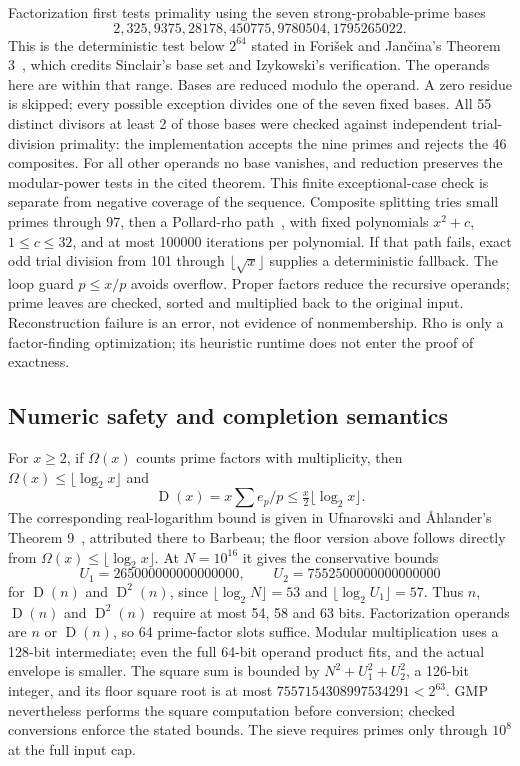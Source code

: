 \documentclass[11pt]{article}
\newcommand{\D}{\operatorname{D}}
\theoremstyle{definition}
\begin{document}
Factorization first tests primality using the seven strong-probable-prime
bases
\[
 2,325,9375,28178,450775,9780504,1795265022.
\]
This is the deterministic test below $2^{64}$ stated in
Fori\v{s}ek and Jan\v{c}ina's Theorem 3~\cite{forisek}, which credits
Sinclair's base set and Izykowski's verification. The operands here are
within that range. Bases are reduced modulo the operand. A zero residue
is skipped; every possible exception divides one of the seven fixed bases.
All 55 distinct divisors at least 2 of those bases were checked against
independent trial-division primality: the implementation accepts the nine
primes and rejects the 46 composites. For all other operands no base
vanishes, and reduction preserves the modular-power tests in the cited
theorem. This finite exceptional-case check is separate from negative
coverage of the sequence. Composite splitting tries small primes through 97,
then a Pollard-rho path~\cite{pollard}, with fixed polynomials
$x^2+c$, $1\le c\le32$, and at most 100000 iterations per polynomial.
If that path fails, exact odd trial division from 101 through
$\lfloor\sqrt x\rfloor$ supplies a deterministic fallback. The
loop guard $p\le x/p$ avoids overflow. Proper factors reduce the
recursive operands; prime leaves are checked, sorted and multiplied back
to the original input. Reconstruction failure is an error, not evidence
of nonmembership. Rho is only a factor-finding optimization; its
heuristic runtime does not enter the proof of exactness.

\subsection{Numeric safety and completion semantics}
For $x\ge2$, if $\Omega(x)$ counts prime factors with multiplicity,
then $\Omega(x)\le\lfloor\log_2x\rfloor$ and
\begin{equation}\label{eq:bound}
 \D(x)=x\sum e_p/p\le\tfrac{x}{2}\lfloor\log_2x\rfloor.
\end{equation}
The corresponding real-logarithm bound is given in
Ufnarovski and \AA hlander's Theorem 9~\cite{ufnarovski}, attributed
there to Barbeau; the floor version above follows directly from
$\Omega(x)\le\lfloor\log_2x\rfloor$.
At $N=10^{16}$ it gives the conservative bounds
\[
 U_1=265000000000000000,
 \qquad U_2=7552500000000000000
\]
for $\D(n)$ and $\D^2(n)$, since
$\lfloor\log_2N\rfloor=53$ and
$\lfloor\log_2 U_1\rfloor=57$. Thus $n$, $\D(n)$ and
$\D^2(n)$ require at most 54, 58 and 63 bits. Factorization operands
are $n$ or $\D(n)$, so 64 prime-factor slots suffice. Modular
multiplication uses a 128-bit intermediate; even the full 64-bit
operand product fits, and the actual envelope is smaller.
The square sum is bounded by $N^2+U_1^2+U_2^2$, a 126-bit integer,
and its floor square root is at most $7557154308997534291<2^{63}$.
GMP nevertheless performs the square computation before conversion;
checked conversions enforce the stated bounds. The sieve requires primes
only through $10^8$ at the full input cap.
\end{document}
